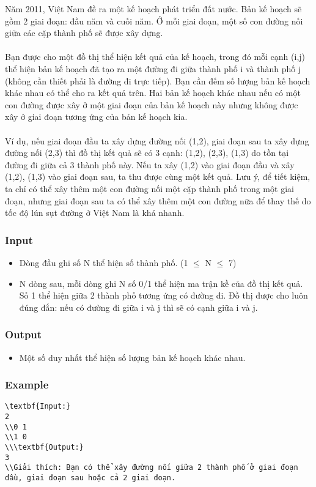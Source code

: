



   Năm 2011, Việt Nam đề ra một kế hoạch phát triển đất nước. Bản kế hoạch sẽ gồm 2 giai đoạn: đầu năm và cuối năm. Ở mỗi giai đoạn, một số con đường nối giữa các cặp thành phố sẽ được xây dựng.   
\\
\\   Bạn được cho một đồ thị thể hiện kết quả của kế hoạch, trong đó mỗi cạnh (i,j) thể hiện bản kế hoạch đã tạo ra một đường đi giữa thành phố i và thành phố j (không cần thiết phải là đường đi trực tiếp). Bạn cần đếm số lượng bản kế hoạch khác nhau có thể cho ra kết quả trên. Hai bản kế hoạch khác nhau nếu có một con đường được xây ở một giai đoạn của bản kế hoạch này nhưng không được xây ở giai đoạn tương ứng của bản kế hoạch kia.   
\\
\\   Ví dụ, nếu giai đoạn đầu ta xây dựng đường nối (1,2), giai đoạn sau ta xây dựng đường nối (2,3) thì đồ thị kết quả sẽ có 3 cạnh: (1,2), (2,3), (1,3) do tồn tại đường đi giữa cả 3 thành phố này. Nếu ta xây (1,2) vào giai đoạn đầu và xây (1,2), (1,3) vào giai đoạn sau, ta thu được cùng một kết quả. Lưu ý, để tiết kiệm, ta chỉ có thể xây thêm một con đường nối một cặp thành phố trong một giai đoạn, nhưng giai đoạn sau ta có thể xây thêm một con đường nữa để thay thế do tốc độ lún sụt đường ở Việt Nam là khá nhanh.  

\subsubsection{   Input  }
\begin{itemize}
	\item     Dòng đầu ghi số N thể hiện số thành phố. (1  $\le$  N  $\le$  7)   
\end{itemize}
\begin{itemize}
	\item     N dòng sau, mỗi dòng ghi N số 0/1 thể hiện ma trận kề của đồ thị kết quả. Số 1 thể hiện giữa 2 thành phố tương ứng có đường đi. Đồ thị được cho luôn đúng đắn: nếu có đường đi giữa i và j thì sẽ có cạnh giữa i và j.   
\end{itemize}

\subsubsection{   Output  }
\begin{itemize}
	\item     Một số duy nhất thể hiện số lượng bản kế hoạch khác nhau.   
\end{itemize}

\subsubsection{   Example  }
\begin{verbatim}
\textbf{Input:}
2
\\0 1
\\1 0
\\\textbf{Output:}
3
\\Giải thích: Bạn có thể xây đường nối giữa 2 thành phố ở giai đoạn đầu, giai đoạn sau hoặc cả 2 giai đoạn.\end{verbatim}
